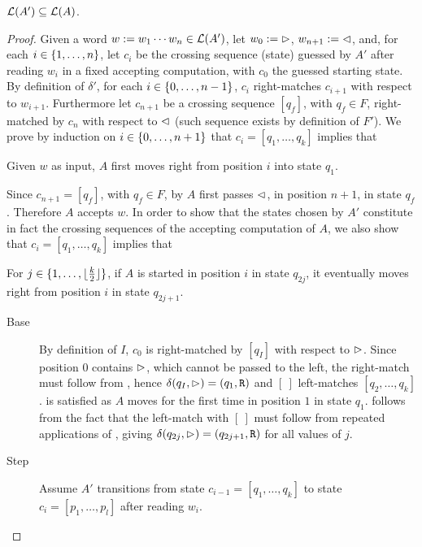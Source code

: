 \begin{lemm}\label{lem:2DFAto1NFA-2}
	$\mathcal L(A')\subseteq\mathcal L(A)$.
\end{lemm}
\begin{proof}
	Given a word $w:=w_1\cdots w_n\in\mathcal L(A')$, let $w_0:=\rhd$, $w_{n+1}:=\lhd$, and, for each $i\in\{1,\dots,n\}$, let $c_i$ be the crossing sequence (state) guessed by $A'$ after reading $w_i$ in a fixed accepting computation, with $c_0$ the guessed starting state.
	By definition of $\delta'$, for each $i\in\{0,\dots,n-1\}$, $c_i$ right-matches $c_{i+1}$ with respect to $w_{i+1}$.
	Furthermore let $c_{n+1}$ be a crossing sequence $[q_f]$, with $q_f\in F$, right-matched by $c_n$ with respect to $\lhd$ (such sequence exists by definition of $F'$).
	We prove by induction on $i\in\{0,\dots,n+1\}$ that $c_i=[q_1,\dots,q_k]$ implies that
	\begin{statements}
		\item \label{lem:2DFAto1NFA-2-1} Given $w$ as input, $A$ first moves right from position $i$ into state $q_1$.
	\end{statements}
	Since $c_{n+1}=[q_f]$, with $q_f\in F$, by  $A$ first passes $\lhd$, in position $n+1$, in state $q_f$. Therefore $A$ accepts $w$.
	In order to show that the states chosen by $A'$ constitute in fact the crossing sequences of the accepting computation of $A$, we also show that $c_i=[q_1,\dots,q_k]$ implies that
	\begin{statements}[resume]
		\item \label{lem:2DFAto1NFA-2-2} For $j\in\{1,\dots,\lfloor \frac{k}{2} \rfloor\}$, if $A$ is started in position $i$ in state $q_{2j}$, it eventually moves right from position $i$ in state $q_{2j+1}$.
	\end{statements}
	\begin{description}
		\item[Base] By definition of $I$, $c_0$ is right-matched by $[q_I]$ with respect to $\rhd$. Since position $0$ contains $\rhd$, which cannot be passed to the left, the right-match must follow from , hence $\delta(q_I,\rhd)=(q_1,\mathtt R)$ and $[~]$ left-matches $[q_2,\dots,q_k]$.
		       is satisfied as $A$ moves for the first time in position $1$ in state $q_1$.
		       follows from the fact that the left-match with $[~]$ must follow from repeated applications of , giving $\delta(q_{2j},\rhd)=(q_{2j+1},\mathtt R)$ for all values of $j$.
		\item[Step] Assume $A'$ transitions from state $c_{i-1}=[q_1,\dots,q_k]$ to state $c_i=[p_1,\dots,p_l]$ after reading $w_i$.

\end{description}
\end{proof}
